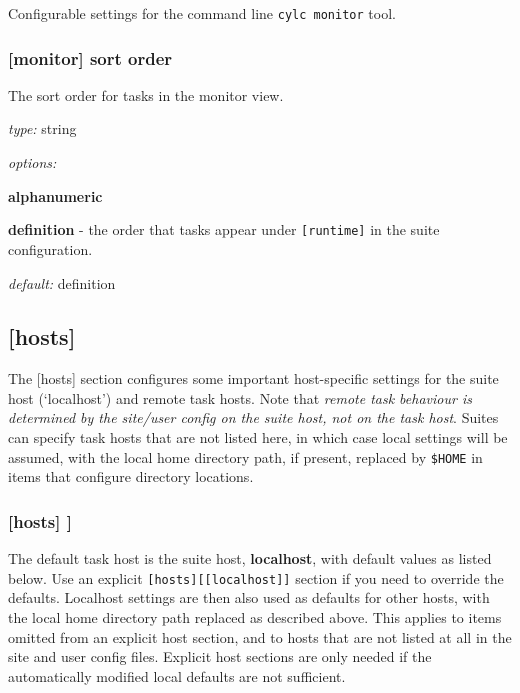 Configurable settings for the command line \lstinline=cylc monitor= tool.

\subsubsection[monitor]{[monitor] \textrightarrow sort order}

The sort order for tasks in the monitor view.
\begin{myitemize}
    \item {\em type:} string
    \item {\em options:}
    \begin{myitemize}
        \item {\bf alphanumeric}
        \item {\bf definition} -  the order that tasks appear under
            \lstinline=[runtime]= in the suite configuration.
    \end{myitemize}
    \item {\em default:} definition
\end{myitemize}

\subsection{[hosts]}

The [hosts] section configures some important host-specific settings for
the suite host (`localhost') and remote task hosts. Note that {\em
remote task behaviour is determined by the site/user config on the
suite host, not on the task host}. Suites can specify task hosts that
are not listed here, in which case local settings will be assumed,
with the local home directory path, if present, replaced by
\lstinline=$HOME= in items that configure directory locations.

\subsubsection[{[[}HOST{]]}]{[hosts] \textrightarrow [[HOST]]}

The default task host is the suite host, {\bf localhost}, with default
values as listed below. Use an explicit \lstinline=[hosts][[localhost]]=
section if you need to override the defaults. Localhost settings are
then also used as defaults for other hosts, with the local home
directory path replaced as described above. This applies to items
omitted from an explicit host section, and to hosts that are not listed
at all in the site and user config files.  Explicit host sections are only
needed if the automatically modified local defaults are not sufficient.

